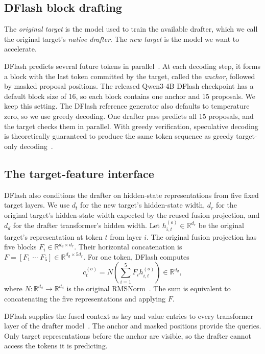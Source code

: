 \subsection{DFlash block drafting}
\label{sec:dflash-background}

The \emph{original target} is the model used to train the available drafter, which we call the original target's \emph{native drafter}. The \emph{new target} is the model we want to accelerate.

DFlash predicts several future tokens in parallel~\citep{chen2026dflash}. At each decoding step, it forms a block with the last token committed by the target, called the \emph{anchor}, followed by masked proposal positions. The released Qwen3-4B DFlash checkpoint has a default block size of 16, so each block contains one anchor and 15 proposals. We keep this setting. The DFlash reference generator also defaults to temperature zero, so we use greedy decoding. One drafter pass predicts all 15 proposals, and the target checks them in parallel. With greedy verification, speculative decoding is theoretically guaranteed to produce the same token sequence as greedy target-only decoding~\citep{leviathan2023speculative,chen2023sampling}.

\subsection{The target-feature interface}

DFlash also conditions the drafter on hidden-state representations from five fixed target layers. We use $d_t$ for the new target's hidden-state width, $d_r$ for the original target's hidden-state width expected by the reused fusion projection, and $d_d$ for the drafter transformer's hidden width. Let $h^{(o)}_{i,t}\in\mathbb R^{d_r}$ be the original target's representation at token $t$ from layer $i$. The original fusion projection has five blocks $F_i\in\mathbb R^{d_d\times d_r}$. Their horizontal concatenation is $F=[F_1\;\cdots\;F_5]\in\mathbb R^{d_d\times 5d_r}$. For one token, DFlash computes
\begin{equation}
 c^{(o)}_t=N\!\left(\sum_{i=1}^{5}F_i h^{(o)}_{i,t}\right)\in\mathbb R^{d_d},
 \label{eq:native-fusion}
\end{equation}
where $N:\mathbb R^{d_d}\to\mathbb R^{d_d}$ is the original RMSNorm~\citep{zhang2019rmsnorm}. The sum is equivalent to concatenating the five representations and applying $F$.

DFlash supplies the fused context as key and value entries to every transformer layer of the drafter model~\citep{chen2026dflash,vaswani2017attention}. The anchor and masked positions provide the queries. Only target representations before the anchor are visible, so the drafter cannot access the tokens it is predicting.

